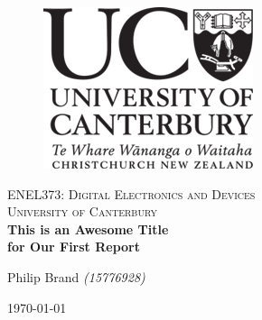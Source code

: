 \documentclass[12pt]{article}
\begin{document}
\begin{titlepage}
    \begin{center}
      \begin{figure}
        \includegraphics[right]{logo.png}
      \end{figure}
      \vspace*{1cm}
      \textsc{\large ENEL373: Digital Electronics and Devices}\\[0.5cm]
      \textsc{\Large University of Canterbury}\\[3.5cm]
      \linespread{1}
      {\Huge\bfseries This is an Awesome Title \\[0.3cm] for Our First Report} \\
      \vspace*{2cm}
      {\Huge Philip Brand \textit{\Large(15776928)}\\\par}
      \vspace*{3cm}
      {\LARGE \today}
    \end{center}
  \end{titlepage}
\restoregeometry

\fancyhead{}
\fancyhead[R]{\small{\today}}





\renewcommand{\baselinestretch}{1.3}\normalsize
\setlength{\cftbeforesecskip}{0.3em}
\renewcommand{\cftsecleader}{\cftdotfill{\cftdotsep}}
\tableofcontents\thispagestyle{fancy}
\renewcommand{\baselinestretch}{1}\normalsize
\end{document}
